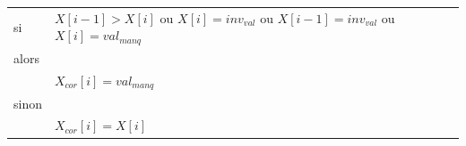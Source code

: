 
\begin{tabular}{llll}
    si &$X[i-1]> X[i]$ ou $X[i] =inv_{val}$ ou $X[i-1] =inv_{val}$ ou $X[i] =val_{manq}$ \\
    alors  \\
    &$X_{cor}[i]=val_{manq}$  \\
    sinon&  \\
    &$X_{cor}[i] =X[i]$ 
\end{tabular}

